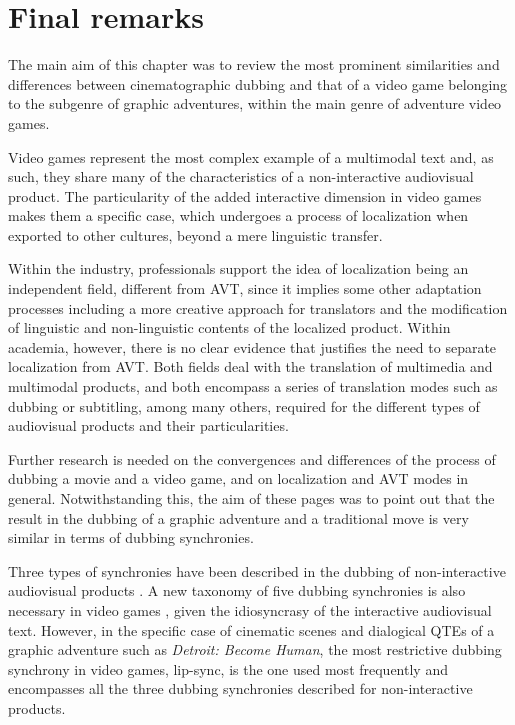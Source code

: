 \documentclass[output=paper]{langsci/langscibook}
\begin{document}
\section{Final remarks}

The main aim of this chapter was to review the most prominent similarities and differences between cinematographic dubbing and that of a video game belonging to the subgenre of graphic adventures, within the main genre of adventure video games.

Video games represent the most complex example of a multimodal text and, as such, they share many of the characteristics of a non-interactive audiovisual product. The particularity of the added interactive dimension in video games makes them a specific case, which undergoes a process of localization when exported to other cultures, beyond a mere linguistic transfer.

Within the industry, professionals support the idea of localization being an independent field, different from AVT, since it implies some other adaptation processes including a more creative approach for translators and the modification of linguistic and non-linguistic contents of the localized product. Within academia, however, there is no clear evidence that justifies the need to separate localization from AVT. Both fields deal with the translation of multimedia and multimodal products, and both encompass a series of translation modes such as dubbing or subtitling, among many others, required for the different types of audiovisual products and their particularities.

Further research is needed on the convergences and differences of the process of dubbing a movie and a video game, and on localization and AVT modes in general. Notwithstanding this, the aim of these pages was to point out that the result in the dubbing of a graphic adventure and a traditional move is very similar in terms of dubbing synchronies.

Three types of synchronies have been described in the dubbing of non-inter\-ac\-tive audiovisual products \parencites{chaume04}{chaume07}{chaume12}. A new taxonomy of five dubbing synchronies is also necessary in video games \parencites{mejias17}{mejias19}, given the idiosyncrasy of the interactive audiovisual text. However, in the specific case of cinematic scenes and dialogical QTEs of a graphic adventure such as \textit{Detroit: Become Human}, the most restrictive dubbing synchrony in video games, lip-sync, is the one used most frequently and encompasses all the three dubbing synchronies described for non-interactive products.
\end{document}
